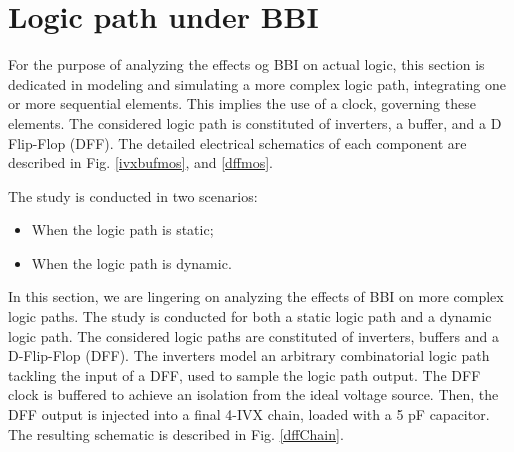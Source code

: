 
\section{Logic path under BBI}
For the purpose of analyzing the effects og BBI on actual logic, this section is dedicated in modeling and simulating a more complex logic path, integrating one or more sequential elements.
This implies the use of a clock, governing these elements.
The considered logic path is constituted of inverters, a buffer, and a D Flip-Flop (DFF).
The detailed electrical schematics of each component are described in Fig. \ref{ivxbufmos}, and \ref{dffmos}.




The study is conducted in two scenarios:
\begin{itemize}
	\item When the logic path is static;
	\item When the logic path is dynamic.
\end{itemize}

In this section, we are lingering on analyzing the effects of BBI on more complex logic paths.
The study is conducted for both a static logic path and a dynamic logic path.
The considered logic paths are constituted of inverters, buffers and a D-Flip-Flop (DFF).
The inverters model an arbitrary combinatorial logic path tackling the input of a DFF, used to sample the logic path output.
The DFF clock is buffered to achieve an isolation from the ideal voltage source.
Then, the DFF output is injected into a final 4-IVX chain, loaded with a 5 pF capacitor.
The resulting schematic is described in Fig. \ref{dffChain}.


